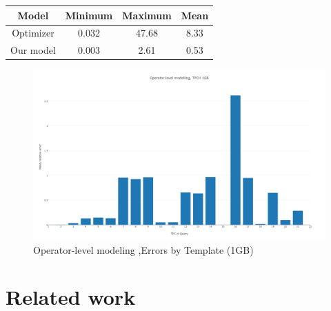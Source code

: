 \documentclass{article}
\begin{document}
\begin{multicols}{2}
	\begin{center}
	\begin{tabular}{ |c|c|c|c| } 
	\hline
	  Model & Minimum & Maximum & Mean\\ [0.5ex] 
	 \hline
	 Optimizer & 0.032  & 47.68 & 8.33 \\
	 Our model & 0.003 & 2.61 & 0.53 \\
	 \hline
	\end{tabular}
	\end{center}

	\begin{figure}[!t]
	  \includegraphics[width=\textwidth]{tpch-1gbres.png}
	  \caption{Operator-level modeling ,Errors by Template (1GB)}
	\end{figure}


	\section {Related work}
		
	

\end{multicols}
\end{document}

